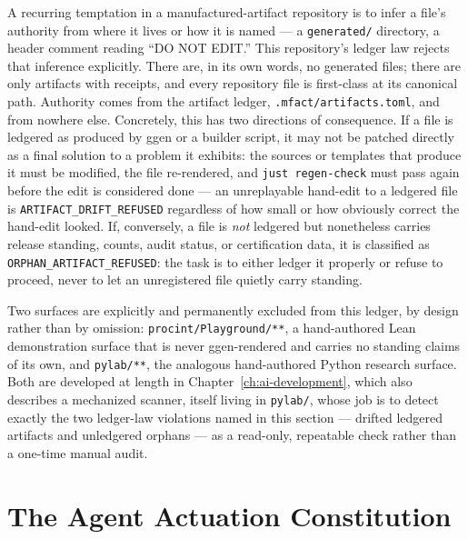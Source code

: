 A recurring temptation in a manufactured-artifact repository is to infer
a file's authority from where it lives or how it is named --- a
\texttt{generated/} directory, a header comment reading ``DO NOT
EDIT.'' This repository's ledger law rejects that inference explicitly.
There are, in its own words, no generated files; there are only
artifacts with receipts, and every repository file is first-class at its
canonical path. Authority comes from the artifact ledger,
\texttt{.mfact/artifacts.toml}, and from nowhere else. Concretely, this
has two directions of consequence. If a file is ledgered as produced by
ggen or a builder script, it may not be patched directly as a final
solution to a problem it exhibits: the sources or templates that produce
it must be modified, the file re-rendered, and \texttt{just regen-check}
must pass again before the edit is considered done --- an unreplayable
hand-edit to a ledgered file is \texttt{ARTIFACT\_DRIFT\_REFUSED}
regardless of how small or how obviously correct the hand-edit looked.
If, conversely, a file is \emph{not} ledgered but nonetheless carries
release standing, counts, audit status, or certification data, it is
classified as \texttt{ORPHAN\_ARTIFACT\_REFUSED}: the task is to either
ledger it properly or refuse to proceed, never to let an unregistered
file quietly carry standing.

Two surfaces are explicitly and permanently excluded from this ledger,
by design rather than by omission: \texttt{procint/Playground/**}, a
hand-authored Lean demonstration surface that is never ggen-rendered and
carries no standing claims of its own, and \texttt{pylab/**}, the
analogous hand-authored Python research surface. Both are developed at
length in Chapter~\ref{ch:ai-development}, which also describes a
mechanized scanner, itself living in \texttt{pylab/}, whose job is to
detect exactly the two ledger-law violations named in this section ---
drifted ledgered artifacts and unledgered orphans --- as a read-only,
repeatable check rather than a one-time manual audit.

\section{The Agent Actuation Constitution}
\label{sec:mfact-actuation}

